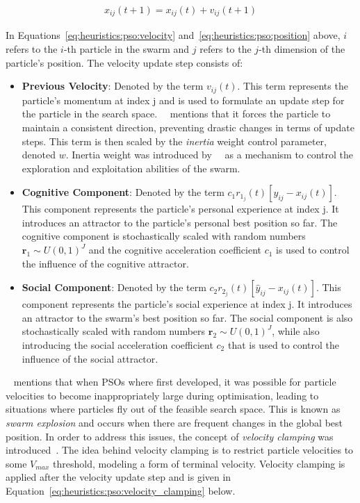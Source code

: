 \begin{equation}
      \label{eq:heuristics:pso:position}
      \begin{split}
            x_{ij}(t+1) = x_{ij}(t) + v_{ij}(t+1)
      \end{split}
\end{equation}

In Equations~\eqref{eq:heuristics:pso:velocity} and~\eqref{eq:heuristics:pso:position} above, $i$ refers to the $i$-th particle in the swarm and $j$ refers to the $j$-th dimension of  the particle's position. The velocity update step consists of:

\begin{itemize}
      \item \textbf{Previous Velocity}: Denoted by the term $v_{ij}(t)$. This term represents the particle's momentum at index j and is used to formulate an update step for the particle in the search space.~\citeauthor{ref:vanwyk:2014}~\cite{ref:vanwyk:2014} mentions that it forces the particle to maintain a consistent direction, preventing drastic changes in terms of update steps. This term is then scaled by the \textit{inertia} weight control parameter, denoted $w$. Inertia weight was introduced by~\citeauthor{ref:shi:1998}~\cite{ref:shi:1998} as a mechanism to control the exploration and exploitation abilities of the swarm.

      \item \textbf{Cognitive Component}: Denoted by the term $c_{1}r_{1_{j}}(t)[y_{ij} - x_{ij}(t)]$. This component represents the particle's personal experience at index j. It introduces an attractor to the particle's personal best position so far. The cognitive component is stochastically scaled with random numbers $\boldsymbol{r}_{1} \sim U(0,1)^J$ and the cognitive acceleration coefficient $c_{1}$ is used to control the influence of the cognitive attractor.

      \item \textbf{Social Component}: Denoted by the term $c_{2}r_{2_{j}}(t)[\hat{y}_{ij} - x_{ij}(t)]$. This component represents the particle's social experience at index j. It introduces an attractor to the swarm's best position so far. The social component is also stochastically scaled with random numbers $\boldsymbol{r}_{2} \sim U(0,1)^J$, while also introducing the social acceleration coefficient $c_{2}$ that is used to control the influence of the social attractor.
\end{itemize}

~\citeauthor{ref:vanwyk:2014}\cite{ref:vanwyk:2014} mentions that when \acp{PSO} where first developed, it was possible for particle velocities to become inappropriately large during optimisation, leading to situations where particles fly out of the feasible search space. This is known as \textit{swarm explosion} and occurs when there are frequent changes in the global best position. In order to address this issues, the concept of \textit{velocity clamping} was introduced~\cite{ref:eberhart:1996}. The idea behind velocity clamping is to restrict particle velocities to some $V_{max}$ threshold, modeling a form of terminal velocity. Velocity clamping is applied after the velocity update step and is given in Equation~\eqref{eq:heuristics:pso:velocity_clamping} below.

